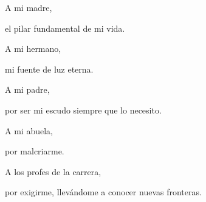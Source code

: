 \begin{dedication}
    A mi madre, 

    el pilar fundamental de mi vida.

    A mi hermano,

    mi fuente de luz eterna.

    A mi padre, 

    por ser mi escudo siempre que lo necesito.

    A mi abuela,

    por malcriarme.

    A los profes de la carrera,

    por exigirme, llev\'andome a conocer nuevas fronteras.

\end{dedication}
